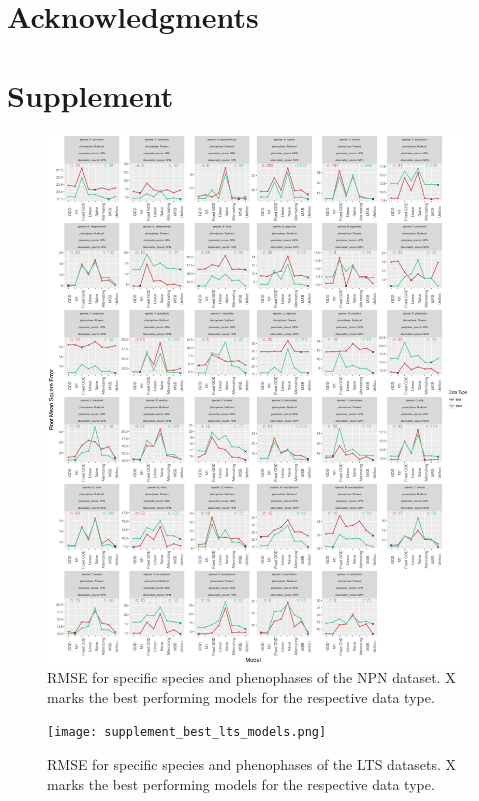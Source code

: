\documentclass[fleqn,10pt,lineno]{wlpeerj} %
\begin{document}
\section*{Acknowledgments}



\setcounter{figure}{0}    
\section*{Supplement}
\begin{figure}
	\centering
		\includegraphics[width=1\textwidth]{supplement_best_npn_models.png}
	\caption{RMSE for specific species and phenophases of the NPN dataset. X marks the best performing models for the respective data type.}
\end{figure}

\begin{figure}
	\centering
		\texttt{[image: supplement\_best\_lts\_models.png]}
	\caption{RMSE for specific species and phenophases of the LTS datasets. X marks the best performing models for the respective data type.}
\end{figure}
\end{document}
